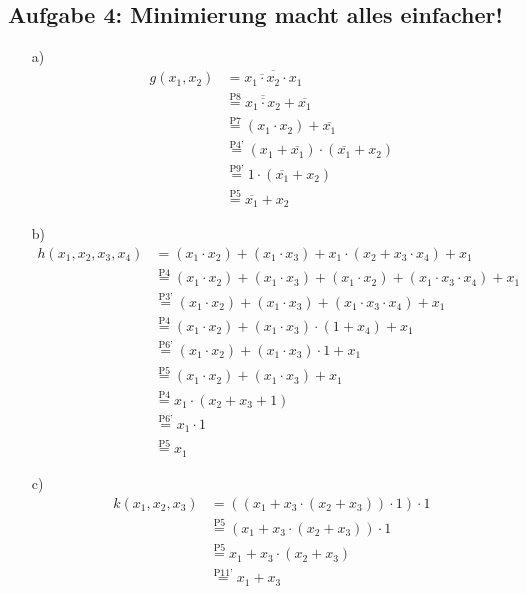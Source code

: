 \documentclass{article}
\begin{document}
    \subsection*{Aufgabe 4: Minimierung macht alles einfacher!}
    \begin{itemize}
    	\item[a)]
    	\begin{align*}
    		g(x_1,x_2) & = \overline{\overline{x_1 \cdot x_2} \cdot x_1} \\
    		& \stackrel{\text{P8}}{=} \overline{\overline{x_1 \cdot x_2}} + \overline{x_1} \\
    		& \stackrel{\text{P7}}{=} (x_1 \cdot x_2) + \overline{x_1} \\
    		& \stackrel{\text{P4'}}{=} (x_1 + \overline{x_1}) \cdot (\overline{x_1} + x_2) \\
    		& \stackrel{\text{P9'}}{=} 1 \cdot (\overline{x_1} + x_2) \\
    		& \stackrel{\text{P5}}{=} \overline{x_1} + x_2
    	\end{align*}
    	\item[b)]
    	\begin{align*}
    		h(x_1,x_2,x_3,x_4) & = (x_1 \cdot x_2) + (x_1 \cdot x_3) + x_1 \cdot (x_2 + x_3 \cdot x_4) + x_1 \\
    		& \stackrel{\text{P4}}{=} (x_1 \cdot x_2) + (x_1 \cdot x_3) + (x_1 \cdot x_2) + (x_1 \cdot x_3 \cdot x_4) + x_1 \\
    		& \stackrel{\text{P3'}}{=} (x_1 \cdot x_2) + (x_1 \cdot x_3) + (x_1 \cdot x_3 \cdot x_4) + x_1 \\
    		& \stackrel{\text{P4}}{=} (x_1 \cdot x_2) + (x_1 \cdot x_3) \cdot (1 + x_4) + x_1 \\
    		& \stackrel{\text{P6'}}{=} (x_1 \cdot x_2) + (x_1 \cdot x_3) \cdot 1 + x_1 \\
    		& \stackrel{\text{P5}}{=} (x_1 \cdot x_2) + (x_1 \cdot x_3) + x_1 \\
    		& \stackrel{\text{P4}}{=} x_1 \cdot (x_2 + x_3 + 1) \\
    		& \stackrel{\text{P6'}}{=} x_1 \cdot 1 \\
    		& \stackrel{\text{P5}}{=} x_1
    	\end{align*}
    	\item[c)]
    	\begin{align*}
    		k(x_1,x_2,x_3) & = ((x_1 + x_3 \cdot (x_2 +x_3)) \cdot 1) \cdot 1 \\
    		& \stackrel{\text{P5}}{=} (x_1 + x_3 \cdot (x_2 +x_3)) \cdot 1 \\
    		& \stackrel{\text{P5}}{=} x_1 + x_3 \cdot (x_2 +x_3) \\
    		& \stackrel{\text{P11'}}{=} x_1 + x_3
    	\end{align*}
    \end{itemize}
    
\end{document}
